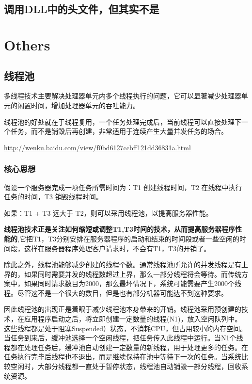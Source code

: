 \documentclass[UTF8,a4paper,8pt]{ctexbook}
\begin{document}
	\section{调用DLL中的头文件，但其实不是}	


\chapter{Others}
	\section{线程池}多线程技术主要解决处理器单元内多个线程执行的问题，它可以显著减少处理器单元的闲置时间，增加处理器单元的吞吐能力。
	
		线程池的好处就在于线程复用，一个任务处理完成后，当前线程可以直接处理下一个任务，而不是销毁后再创建，非常适用于连续产生大量并发任务的场合。
			
		\url{http://wenku.baidu.com/view/f0bd6127ccbff121dd36831a.html}
	
		\subsection{核心思想} 假设一个服务器完成一项任务所需时间为：T1 创建线程时间，T2 在线程中执行任务的时间，T3 销毁线程时间。
		
		如果：T1 + T3 远大于 T2，则可以采用线程池，以提高服务器性能。
		
		\textbf{线程池技术正是关注如何缩短或调整T1,T3时间的技术，从而提高服务器程序性能的},它把T1，T3分别安排在服务器程序的启动和结束的时间段或者一些空闲的时间段，这样在服务器程序处理客户请求时，不会有T1，T3的开销了。
		
		除此之外，线程池能够减少创建的线程个数。通常线程池所允许的并发线程是有上界的，如果同时需要并发的线程数超过上界，那么一部分线程将会等待。而传统方案中，如果同时请求数目为2000，那么最坏情况下，系统可能需要产生2000个线程。尽管这不是一个很大的数目，但是也有部分机器可能达不到这种要求。  
		
		因此线程池的出现正是着眼于减少线程池本身带来的开销。线程池采用预创建的技术，在应用程序启动之后，将立即创建一定数量的线程(N1)，放入空闲队列中。这些线程都是处于阻塞Suspended）状态，不消耗CPU，但占用较小的内存空间。当任务到来后，缓冲池选择一个空闲线程，把任务传入此线程中运行。当N1个线程都在处理任务后，缓冲池自动创建一定数量的新线程，用于处理更多的任务。在任务执行完毕后线程也不退出，而是继续保持在池中等待下一次的任务。当系统比较空闲时，大部分线程都一直处于暂停状态，线程池自动销毁一部分线程，回收系统资源。  
		
\end{document}
